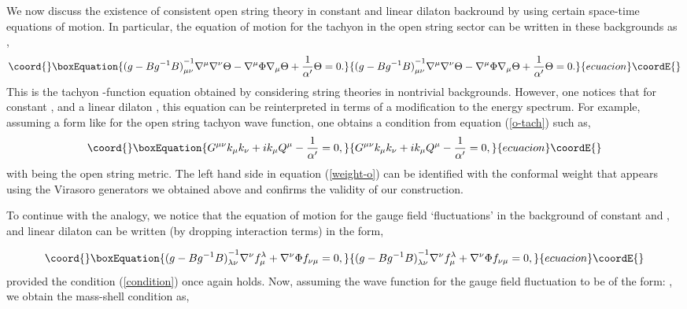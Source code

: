 \documentclass[a4paper,12pt]{article}
\begin{document}
We now discuss the existence of consistent open string theory in  
constant \coordHE{} and linear dilaton backround by using certain space-time 
equations of motion. In particular, the equation of motion for the 
tachyon in the open string sector can be written 
in these backgrounds as \cite{nappi,callan,friedan},
\begin{equation}\coord{}\boxEquation{
{(g - B g^{-1} B)}^{-1}_{\mu \nu} \nabla^{\mu}\nabla^{\nu}
\Theta - \nabla^{\mu}\Phi \nabla_{\mu} \Theta + 
{1\over \alpha'} \Theta = 0. 
\label{o-tach}
}{
{(g - B g^{-1} B)}^{-1}_{\mu \nu} \nabla^{\mu}\nabla^{\nu}
\Theta - \nabla^{\mu}\Phi \nabla_{\mu} \Theta + 
{1\over \alpha'} \Theta = 0. 
}{ecuacion}\coordE{}\end{equation}
This is the tachyon \myHighlight{$\beta$}\coordHE{}-function equation obtained by 
considering string theories in nontrivial 
backgrounds\cite{callan,friedan}.
However, one notices that for constant \coordHE{}, \coordHE{} and a linear dilaton
\myHighlight{$\Phi$}\coordHE{}, this equation can be reinterpreted in terms of  a 
modification to the energy spectrum.
For example, assuming a form like \coordHE{} for the 
open string tachyon wave function,
one obtains a condition from equation (\ref{o-tach}) such as,
\begin{equation}\coord{}\boxEquation{
G^{\mu \nu} k_{\mu} k_{\nu} + i k_{\mu} Q^{\mu}
- {1\over \alpha'} =0, 
\label{weight-o}
}{
G^{\mu \nu} k_{\mu} k_{\nu} + i k_{\mu} Q^{\mu}
- {1\over \alpha'} =0, 
}{ecuacion}\coordE{}\end{equation}
with \coordHE{} being the open  string metric. 
The left hand side in equation (\ref{weight-o})
can be identified with 
the conformal weight that appears using the Virasoro generators
we obtained above and confirms the validity of our construction. 

To continue with the analogy, we notice that the equation of motion for 
the gauge field `fluctuations' in the background of constant \coordHE{} and
\coordHE{}, and linear dilaton can be written (by dropping interaction terms)
in the form\cite{callan,friedan}, 

\begin{equation}\coord{}\boxEquation{
{(g - B g^{-1} B)}^{-1}_{\lambda \nu}\nabla^{\nu} f_{\mu}^{\lambda}
+ \nabla^{\nu}\Phi f_{\nu \mu} =  0,
\label{o-gauge}
}{
{(g - B g^{-1} B)}^{-1}_{\lambda \nu}\nabla^{\nu} f_{\mu}^{\lambda}
+ \nabla^{\nu}\Phi f_{\nu \mu} =  0,
}{ecuacion}\coordE{}\end{equation}
provided the condition (\ref{condition}) once again holds. 
Now, assuming the wave function for the gauge 
field fluctuation to be of the form:
\coordHE{},
we obtain the mass-shell condition as,
\end{document}
